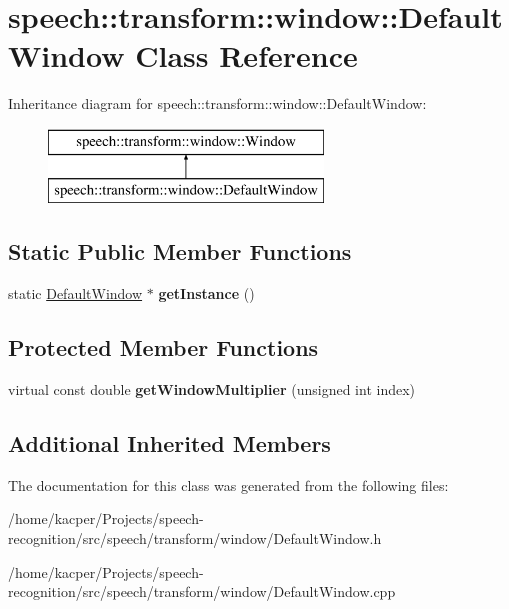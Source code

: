 \hypertarget{classspeech_1_1transform_1_1window_1_1DefaultWindow}{\section{speech\+:\+:transform\+:\+:window\+:\+:Default\+Window Class Reference}
\label{classspeech_1_1transform_1_1window_1_1DefaultWindow}
}
Inheritance diagram for speech\+:\+:transform\+:\+:window\+:\+:Default\+Window\+:\begin{figure}[H]
\begin{center}
\leavevmode
\includegraphics[height=2.000000cm]{classspeech_1_1transform_1_1window_1_1DefaultWindow}
\end{center}
\end{figure}
\subsection*{Static Public Member Functions}
\begin{DoxyCompactItemize}
\item 
\hypertarget{classspeech_1_1transform_1_1window_1_1DefaultWindow_a2c4f779a61c73cc77ce25e3147f05362}{static \hyperlink{classspeech_1_1transform_1_1window_1_1DefaultWindow}{Default\+Window} $\ast$ {\bfseries get\+Instance} ()}\label{classspeech_1_1transform_1_1window_1_1DefaultWindow_a2c4f779a61c73cc77ce25e3147f05362}

\end{DoxyCompactItemize}
\subsection*{Protected Member Functions}
\begin{DoxyCompactItemize}
\item 
\hypertarget{classspeech_1_1transform_1_1window_1_1DefaultWindow_a26e59d18a96737cd2279c8fa638174d6}{virtual const double {\bfseries get\+Window\+Multiplier} (unsigned int index)}\label{classspeech_1_1transform_1_1window_1_1DefaultWindow_a26e59d18a96737cd2279c8fa638174d6}

\end{DoxyCompactItemize}
\subsection*{Additional Inherited Members}


The documentation for this class was generated from the following files\+:\begin{DoxyCompactItemize}
\item 
/home/kacper/\+Projects/speech-\/recognition/src/speech/transform/window/Default\+Window.\+h\item 
/home/kacper/\+Projects/speech-\/recognition/src/speech/transform/window/Default\+Window.\+cpp\end{DoxyCompactItemize}
